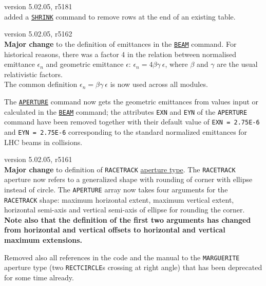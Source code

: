 \begin{madlist}
   version 5.02.05, r5181\\
  added a \hyperref[sec:shrink]{\tt SHRINK} command to remove 
  rows at the end of an existing table.

   version 5.02.05, r5162\\
  {\bf Major change} to the definition of emittances in the 
  \hyperref[chap:beam]{\tt BEAM} command. For historical reasons, 
  there was a factor 4 in the relation between normalised emittance 
  $\epsilon_n$ and geometric emittance $\epsilon$: 
  $\epsilon_n = 4 \beta \gamma \ \epsilon$, where $\beta$ and 
  $\gamma$ are the usual relativistic factors. \\
  The common definition $\epsilon_n = \beta \gamma \ \epsilon$ 
  is now used across all \madx modules.
  
  The \hyperref[sec:aperture]{\tt APERTURE} command now gets the 
  geometric emittances from values input or calculated in the 
  \hyperref[chap:beam]{\tt BEAM} command; the attributes {\tt EXN} 
  and {\tt EYN} of the {\tt APERTURE} command have been removed 
  together with their default value of {\tt EXN = 2.75E-6} and 
  {\tt EYN = 2.75E-6} corresponding to the standard normalized 
  emittances for LHC beams in collisions. 
  

   version 5.02.05, r5161\\
  {\bf Major change} to definition of {\tt RACETRACK} 
  \hyperref[sec:def_aper]{aperture type}. 
  The {\tt RACETRACK} aperture now refers to a generalized shape 
  with rounding of corner with ellipse instead of circle. 
  The {\tt APERTURE} array now takes four arguments for the 
  {\tt RACETRACK} shape: maximum horizontal extent, maximum 
  vertical extent, horizontal semi-axis and vertical semi-axis 
  of ellipse for rounding the corner. \\
  {\bf Note also that the definition of the first two arguments 
  has changed from horizontal and vertical offsets to horizontal 
  and vertical maximum extensions.}

  Removed also all references in the code and the manual to the 
  {\tt MARGUERITE} aperture type (two {\tt RECTCIRCLE}s 
  crossing at right angle) that has been deprecated for some 
  time already.



\end{madlist}
